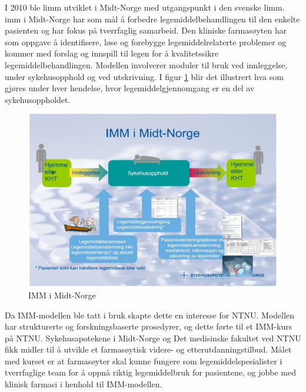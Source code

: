 I 2010 ble \gls{limm} utviklet i Midt-Norge med utgangspunkt i den svenske \gls{limm}. \gls{imm} i Midt-Norge har som mål å forbedre legemiddelbehandlingen til den enkelte pasienten og har fokus på tverrfaglig samarbeid. Den kliniske farmasøyten har som oppgave å identifisere, løse og forebygge legemiddelrelaterte problemer og kommer med forslag og innspill til legen for å kvalitetssikre legemiddelbehandlingen. Modellen involverer moduler til bruk ved innleggelse, under sykehusopphold og ved utskrivning. I figur \ref{fig:imm}  blir det illustrert hva som gjøres under hver hendelse, hvor legemiddelgjennomgang er en del av sykehusoppholdet.
\\\citep{IMM_i_midtnorge}

\begin{figure}[H]
\centering
\includegraphics[width= 12cm]{images/IMM_I_MIDT_NORGE.JPG}
\caption{IMM i Midt-Norge}
\label{fig:imm}
\end{figure}

Da IMM-modellen ble tatt i bruk skapte dette en interesse for NTNU. Modellen har strukturerte og forskningsbaserte prosedyrer, og dette førte til et IMM-kurs på NTNU. Sykehusapotekene i Midt-Norge og Det medisinske fakultet ved NTNU fikk midler til å utvikle et farmasøytisk videre- og etterutdanningstilbud. Målet med kurset er at farmasøyter skal kunne fungere som legemiddelspesialister i tverrfaglige team for å oppnå riktig legemiddelbruk for pasientene, og jobbe med klinisk farmasi i henhold til IMM-modellen.  \citep{IMM_MODELLEN_TIL_NORGE} \citep{MDV6000}
